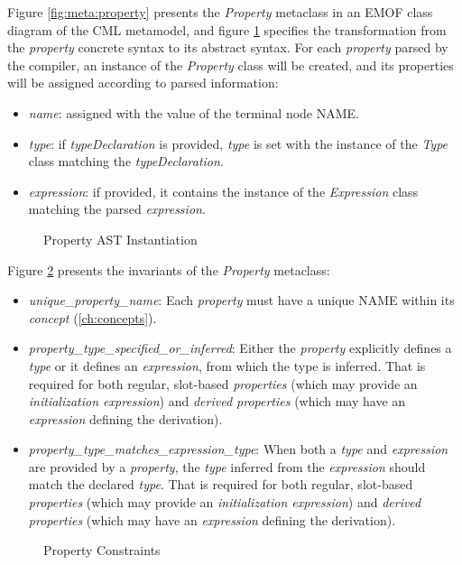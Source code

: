 \begin{abstract-syntax}
Figure \ref{fig:meta:property} presents the \emph{Property} metaclass
in an EMOF \cite{mof} class diagram of the CML metamodel,
and figure \ref{fig:ast:property} specifies
the transformation
from the \emph{property} concrete syntax to its abstract syntax.
For each \emph{property} parsed by the compiler,
an instance of the \emph{Property} class will be created,
and its properties will be assigned
according to parsed information:

\begin{itemize}

\item \emph{name}:
assigned with the value of the terminal node NAME.

\item \emph{type}:
if \emph{typeDeclaration} is provided,
\emph{type} is set with the instance of the \emph{Type} class
matching the \emph{typeDeclaration}.

\item \emph{expression}:
if provided,
it contains the instance of the \emph{Expression} class
matching the parsed \emph{expression}.

\end{itemize}
\end{abstract-syntax}

\begin{figure}
\verbatimfont{\small}

\caption{Property AST Instantiation}
\label{fig:ast:property}
\end{figure}

\begin{constraints}
Figure \ref{fig:ocl:property} presents the invariants
of the \emph{Property} metaclass:

\begin{itemize}

\item \emph{unique\_property\_name}:
Each \emph{property} must have a unique NAME within its \emph{concept}
(\ref{ch:concepts}).

\item \emph{property\_type\_specified\_or\_inferred}:
Either the \emph{property} explicitly defines a \emph{type}
or it defines an \emph{expression},
from which the type is inferred.
That is required for both regular, slot-based \emph{properties}
(which may provide an \emph{initialization expression})
and \emph{derived properties}
(which may have an \emph{expression} defining the derivation).

\item \emph{property\_type\_matches\_expression\_type}:
When both a \emph{type} and \emph{expression} are provided by a \emph{property},
the \emph{type} inferred from the \emph{expression} should match
the declared \emph{type}.
That is required for both regular, slot-based \emph{properties}
(which may provide an \emph{initialization expression})
and \emph{derived properties}
(which may have an \emph{expression} defining the derivation).

\end{itemize}
\end{constraints}

\begin{figure}

\caption{Property Constraints}
\label{fig:ocl:property}
\end{figure}
